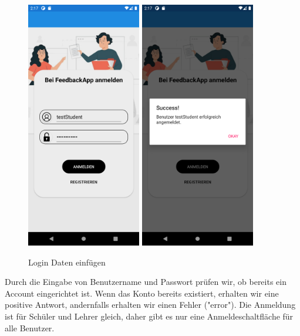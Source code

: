 \begin{figure}[h]
    \begin{center}
    \includegraphics[width=5cm]{pics/Xamarin Student/5 Login Page Full.png}\hfill
    \includegraphics[width=5cm]{pics/Xamarin Student/6 Login Page Success.png}
    \caption[LoginPage Ansicht]{Login Daten einfügen}
    \end{center}
\end{figure}
Durch die Eingabe von Benutzername und Passwort prüfen wir, ob bereits ein Account eingerichtet ist. Wenn das Konto bereits existiert, erhalten wir eine positive Antwort, andernfalls erhalten wir einen Fehler ("error"). Die Anmeldung ist für Schüler und Lehrer gleich, daher gibt es nur eine Anmeldeschaltfläche für alle Benutzer.\newpage
\newpage

